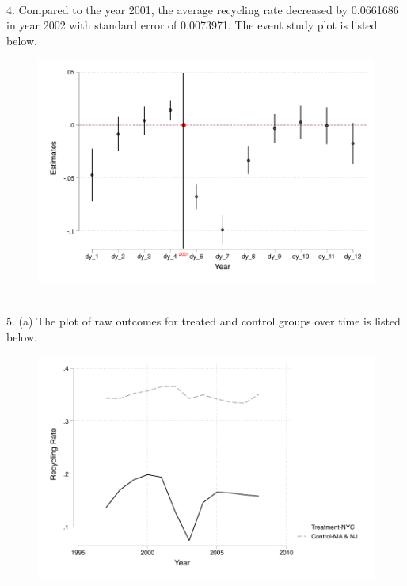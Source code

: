 \documentclass{article}
\begin{document}
~\\
4. Compared to the year 2001, the average recycling rate decreased by 0.0661686 in year 2002 with standard error of 0.0073971. The event study plot is listed below. 
\begin{figure}[H]
\centering
\includegraphics[scale = 0.9]{question4.pdf}	
\end{figure}


~\\
5. (a) The plot of raw outcomes for treated and control groups over time is listed below.
\begin{figure}[H]
\centering
\includegraphics[scale = 0.9]{question5a.pdf}	
\end{figure}
~\\
\end{document}
